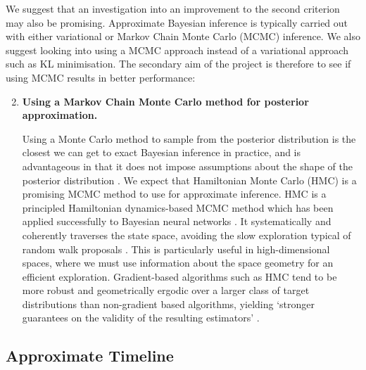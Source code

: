 \documentclass[a4paper,11=0pt]{article}
\begin{document}
\vspace{0.5em}
We suggest that an investigation into an improvement to the second criterion may also be promising. Approximate Bayesian inference is typically carried out with either variational or Markov Chain Monte Carlo (MCMC) inference. We also suggest looking into using a MCMC approach instead of a variational approach such as KL minimisation. The secondary aim of the project is therefore to see if using MCMC results in better performance:
\begin{enumerate}
\setcounter{enumi}{1}
\item \textbf{Using a Markov Chain Monte Carlo method for posterior approximation.}

Using a Monte Carlo method to sample from the posterior distribution is the closest we can get to exact Bayesian inference in practice, and is advantageous in that it does not impose assumptions about the shape of the posterior distribution \cite{hinton}.
We expect that Hamiltonian Monte Carlo (HMC) is a promising MCMC method to use for approximate inference. HMC is a principled Hamiltonian dynamics-based MCMC method which has been applied successfully to Bayesian neural networks \cite{bayesianlearning}. It systematically and coherently traverses the state space, avoiding the slow exploration typical of random walk proposals \cite{hmc}. This is particularly useful in high-dimensional spaces, where we must use information about the space geometry for an efficient exploration. Gradient-based algorithms such as HMC tend to be more robust and geometrically ergodic over a larger class of target distributions than non-gradient based algorithms, yielding `stronger guarantees on the validity of the resulting estimators' \cite{conceptual}.
\end{enumerate}


\subsection*{Approximate Timeline}
\end{document}
